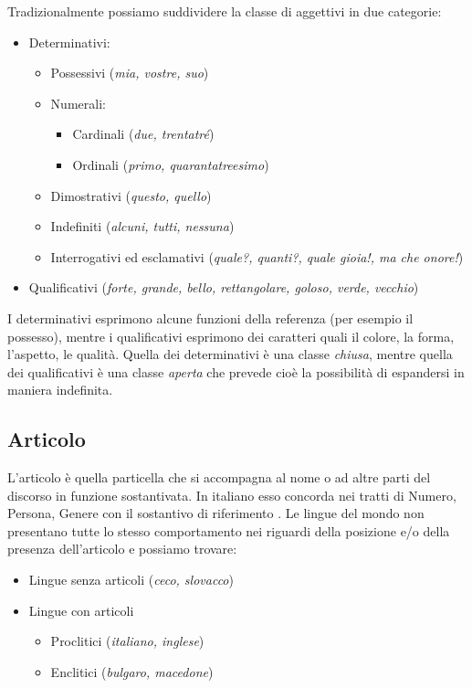 \documentclass[a4paper,twoside,11pt,chapterprefix=false,bibliography=totocnumbered,listof=flat]{scrbook}
\providecommand{\tightlist}{%
  \setlength{\itemsep}{0pt}\setlength{\parskip}{0pt}}
\begin{document}
Tradizionalmente possiamo suddividere la classe di aggettivi in due
categorie:

\begin{itemize}
\tightlist
\item
  Determinativi:

  \begin{itemize}
  \tightlist
  \item
    Possessivi (\emph{mia, vostre, suo})
  \item
    Numerali:

    \begin{itemize}
    \tightlist
    \item
      Cardinali (\emph{due, trentatré})
    \item
      Ordinali (\emph{primo, quarantatreesimo})
    \end{itemize}
  \item
    Dimostrativi (\emph{questo, quello})
  \item
    Indefiniti (\emph{alcuni, tutti, nessuna})
  \item
    Interrogativi ed esclamativi (\emph{quale?, quanti?, quale gioia!,
    ma che onore!})
  \end{itemize}
\item
  Qualificativi (\emph{forte, grande, bello, rettangolare, goloso,
  verde, vecchio})
\end{itemize}

I determinativi esprimono alcune funzioni della referenza (per esempio
il possesso), mentre i qualificativi esprimono dei caratteri quali il
colore, la forma, l'aspetto, le qualità. Quella dei determinativi è una
classe \emph{chiusa}, mentre quella dei qualificativi è una classe
\emph{aperta} che prevede cioè la possibilità di espandersi in maniera
indefinita.

\subsection{Articolo}\label{articolo}

L'articolo è quella particella che si accompagna al nome o ad altre
parti del discorso in funzione sostantivata. In italiano esso concorda
nei tratti di Numero, Persona, Genere con il sostantivo di riferimento
\citep{grandi2010}. Le lingue del mondo non presentano tutte lo stesso
comportamento nei riguardi della posizione e/o della presenza
dell'articolo e possiamo trovare:

\begin{itemize}
\tightlist
\item
  Lingue senza articoli (\emph{ceco, slovacco})
\item
  Lingue con articoli

  \begin{itemize}
  \tightlist
  \item
    Proclitici (\emph{italiano, inglese})
  \item
    Enclitici (\emph{bulgaro, macedone})
  \end{itemize}
\end{itemize}
\end{document}
